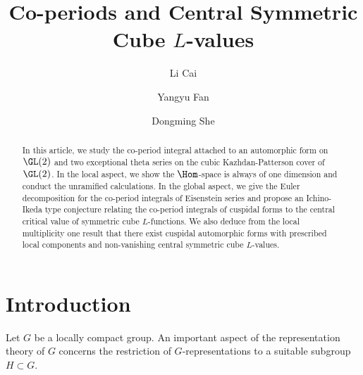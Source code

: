 \documentclass[11pt,reqno]{amsart}
\theoremstyle{plain}
\theoremstyle{remark} \newtheorem{remark}[thm]{Remark}
\theoremstyle{definition} \newtheorem{exercise}[thm]{Exercise}
\theoremstyle{definition} \newtheorem{example}[thm]{Example} \newtheorem{condition}[thm]{Condition}
\numberwithin{equation}{section}
\renewcommand{\-}{\text{--}}
\begin{document}
	\title{Co-periods and Central Symmetric Cube $L$-values}
	
    \begin{abstract}
    In this article, we  study  the co-period  integral attached to an automorphic form on $\GL(2)$ and two exceptional theta series on the cubic Kazhdan-Patterson cover of $\GL(2)$.  In the local aspect, we show the $\Hom$-space is always of one dimension and conduct the unramified calculations. In the
global aspect, we give the Euler decomposition for the co-period integrals of Eisenstein series and propose an Ichino-Ikeda type conjecture relating the co-period integrals of cuspidal forms to the central critical value of symmetric cube $L$-functions. We also deduce from the local multiplicity one result that there exist cuspidal automorphic forms with prescribed local components and non-vanishing central symmetric cube $L$-values.
\end{abstract}


\author{Li Cai}
\address{Academy for Multidisciplinary Studies\\
Beijing National Center for Applied Mathematics\\
Capital Normal University\\
Beijing, 100048, People's Republic of China}

\author{Yangyu Fan}
\address{Key Laboratory of Algebraic Lie Theory and Analysis of Ministry of Education\\ School of Mathematics and Statistics\\ Beijing Institute of Technology\\ Beijing, 100081, People's Republic of China}

\author{Dongming She}
\address{Yanqi Lake Beijing Institute of Mathematical Sciences and Applications (BIMSA)\\ Huairou District, 100084, Beijing, People's Republic of China.}
\maketitle
	\tableofcontents{}

    \section{Introduction}
Let $G$ be a locally compact group. An important aspect of the representation theory of $G$ concerns the restriction of  $G$-representations to a suitable subgroup $H\subset G$.
\end{document}
